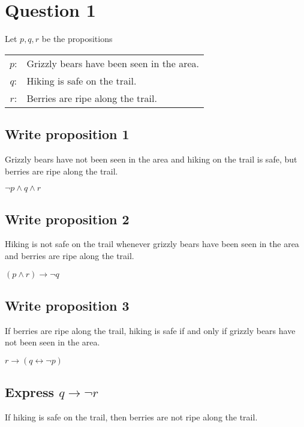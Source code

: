 \documentclass{article}
\newcommand{\YearPath}{../../../LatexConfig} %
\newcommand{\SemesterPath}{../../LatexConfig} %
\newcommand{\ClassPath}{../LatexConfig} %
\begin{document}




\section{Question 1}
% 
Let $p, q, r$ be the propositions
\begin{center}
  \begin{tabular}{cl}
    $p$: & Grizzly bears have been seen in the area. \\ 
    $q$: & Hiking is safe on the trail. \\
    $r$: & Berries are ripe along the trail. \\
  \end{tabular}
\end{center}

\subsection{Write proposition 1}
Grizzly bears have not been seen in the area and hiking on the trail is safe, but berries are ripe
along the trail.

\begin{center}
  $ \lnot p \land q \land r $
\end{center}

\subsection{Write proposition 2}
Hiking is not safe on the trail whenever grizzly bears have been seen in the area and berries are
ripe along the trail.

\begin{center}
  $ (p \land r) \rightarrow \lnot q $
\end{center}

\subsection{Write proposition 3}
If berries are ripe along the trail, hiking is safe if and only if grizzly bears have not been seen
in the area.

\begin{center}
  $ r \rightarrow (q \leftrightarrow \lnot p) $
\end{center}

\subsection{Express $q \rightarrow \lnot r$}
If hiking is safe on the trail, then berries are not ripe along the trail.
\end{document}
